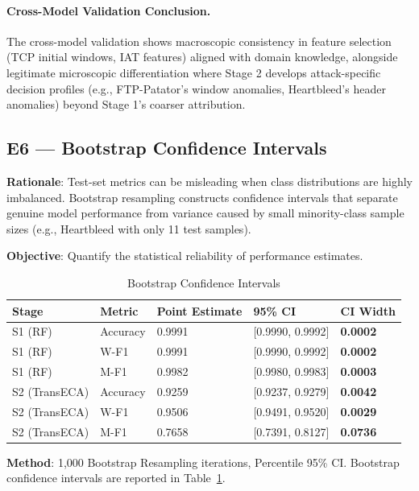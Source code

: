 \documentclass[sigconf]{acmart}
\begin{document}
\paragraph{Cross-Model Validation Conclusion.}
The cross-model validation shows macroscopic consistency in feature selection (TCP initial windows, IAT features) aligned with domain knowledge, alongside legitimate microscopic differentiation where Stage 2 develops attack-specific decision profiles (e.g., FTP-Patator's window anomalies, Heartbleed's header anomalies) beyond Stage 1's coarser attribution.

\subsection{E6 --- Bootstrap Confidence Intervals}
\textbf{Rationale}: Test-set metrics can be misleading when class distributions are highly imbalanced. Bootstrap resampling constructs confidence intervals that separate genuine model performance from variance caused by small minority-class sample sizes (e.g., Heartbleed with only 11 test samples).

\textbf{Objective}: Quantify the statistical reliability of performance estimates.


\begin{table}[!t]
\caption{Bootstrap Confidence Intervals}
\label{tab:bootstrap_ci}
\begin{tabular}{lllll}
\toprule
\textbf{Stage} & \textbf{Metric} & \textbf{Point Estimate} & \textbf{95\% CI} & \textbf{CI Width} \\
\midrule
S1 (RF) & Accuracy & 0.9991 & [0.9990, 0.9992] & \textbf{0.0002} \\
S1 (RF) & W-F1 & 0.9991 & [0.9990, 0.9992] & \textbf{0.0002} \\
S1 (RF) & M-F1 & 0.9982 & [0.9980, 0.9983] & \textbf{0.0003} \\
S2 (TransECA) & Accuracy & 0.9259 & [0.9237, 0.9279] & \textbf{0.0042} \\
S2 (TransECA) & W-F1 & 0.9506 & [0.9491, 0.9520] & \textbf{0.0029} \\
S2 (TransECA) & M-F1 & 0.7658 & [0.7391, 0.8127] & \textbf{0.0736} \\
\bottomrule
\end{tabular}
\end{table}

\textbf{Method}: 1,000 Bootstrap Resampling iterations, Percentile 95\% CI. Bootstrap confidence intervals are reported in Table~\ref{tab:bootstrap_ci}.
\end{document}
